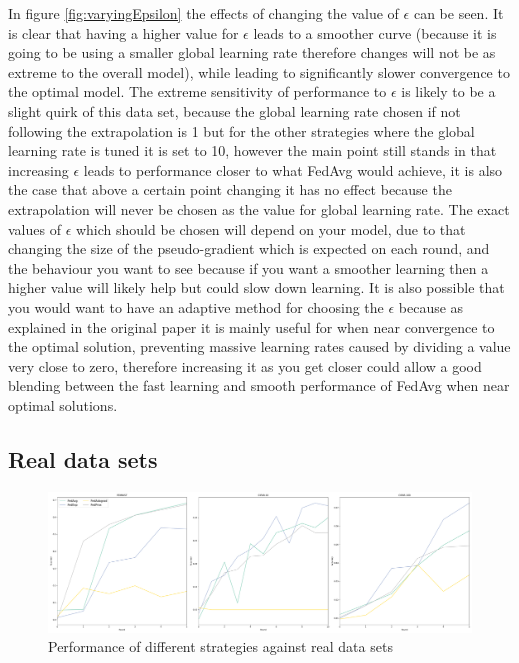 \documentclass{article}
\begin{document}
In figure \ref{fig:varyingEpsilon} the effects of changing the value of $\epsilon$ can be seen.  It is clear that having a higher value for $\epsilon$ leads to a smoother curve (because it is going to be using a smaller global learning rate therefore changes will not be as extreme to the overall model), while leading to significantly slower convergence to the optimal model.  The extreme sensitivity of performance to $\epsilon$ is likely to be a slight quirk of this data set, because the global learning rate chosen if not following the extrapolation is 1 but for the other strategies where the global learning rate is tuned it is set to 10, however the main point still stands in that increasing $\epsilon$ leads to performance closer to what FedAvg would achieve, it is also the case that above a certain point changing it has no effect because the extrapolation will never be chosen as the value for global learning rate.  The exact values of $\epsilon$ which should be chosen will depend on your model, due to that changing the size of the pseudo-gradient which is expected on each round, and the behaviour you want to see because if you want a smoother learning then a higher value will likely help but could slow down learning.  It is also possible that you would want to have an adaptive method for choosing the $\epsilon$ because as explained in the original paper it is mainly useful for when near convergence to the optimal solution, preventing massive learning rates caused by dividing a value very close to zero, therefore increasing it as you get closer could allow a good blending between the fast learning and smooth performance of FedAvg when near optimal solutions.

\subsection{Real data sets}

\begin{figure}
    \centerline{\includegraphics[width=\linewidth]{figs/realDatasetPerformance.pdf}}
    \caption{Performance of different strategies against real data sets}
    \label{fig:realDatasetPerformance}
\end{figure}
\end{document}
